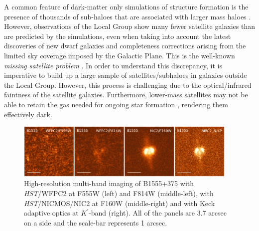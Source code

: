\documentclass[a4paper,fleqn,usenatbib,useAMS]{mnras}
\begin{document}
A common feature of dark-matter only simulations of structure formation is the presence of thousands of sub-haloes that are associated with larger mass haloes \citep[e.g.][]{Springel08}. However, observations of the Local Group show many fewer satellite galaxies than are predicted by the simulations, even when taking into account the latest discoveries of new dwarf galaxies \citep{DES15,Kop15} and completeness corrections arising from the limited sky coverage imposed by the Galactic Plane.  
This is the well-known {\it missing satellite problem} \citep{Klypin1999,Moore1999,S07}. In order to understand this discrepancy, it is imperative to build up a large sample of satellites/subhaloes in galaxies outside the Local Group. However, this process is challenging due to the optical/infrared faintness of the satellite galaxies.  Furthermore, lower-mass satellites may not be able to retain the gas needed for ongoing star formation \citep[e.g.][]{P11}, rendering them effectively dark.  

\begin{figure}
\includegraphics[width=0.95\textwidth]{B1555_gallery.eps}
\caption{High-resolution multi-band imaging of B1555+375 with {\it HST}/WFPC2 at F555W (left) and F814W (middle-left), with {\it HST}/NICMOS/NIC2 at F160W (middle-right) and with Keck adaptive optics at $K^\prime$-band (right). All of the panels are 3.7 arcsec on a side and the scale-bar represents 1 arcsec.}
\label{fig:multiband}
\end{figure}
\end{document}
